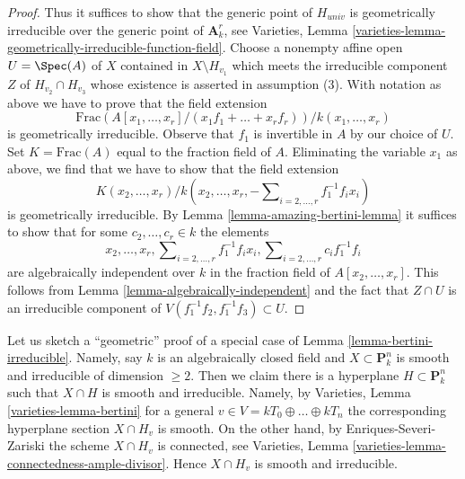 \begin{proof}
\medskip\noindent
Thus it suffices to show that the generic point of $H_{univ}$
is geometrically irreducible over the generic point of $\mathbf{A}^r_k$, see
Varieties, Lemma
\ref{varieties-lemma-geometrically-irreducible-function-field}.
Choose a nonempty affine open $U = \Spec(A)$ of $X$
contained in $X \setminus H_{v_1}$ which meets the irreducible
component $Z$ of $H_{v_2} \cap H_{v_3}$ whose existence is asserted in
assumption (3). With notation as above we have to prove that
the field extension
$$
\text{Frac}(A[x_1, \ldots, x_r]/(x_1f_1 + \ldots + x_rf_r))/
k(x_1, \ldots , x_r)
$$
is geometrically irreducible. Observe that $f_1$ is invertible in $A$
by our choice of $U$.
Set $K = \text{Frac}(A)$ equal to the fraction field of $A$.
Eliminating the variable $x_1$ as above,
we find that we have to show that the field extension
$$
K(x_2, \ldots, x_r)/
k(x_2, \ldots, x_r, -\sum\nolimits_{i = 2, \ldots, r} f_1^{-1}f_i x_i)
$$
is geometrically irreducible. By Lemma \ref{lemma-amazing-bertini-lemma}
it suffices to show that for some $c_2, \ldots, c_r \in k$ the elements
$$
x_2, \ldots, x_r, \sum\nolimits_{i = 2, \ldots, r} f_1^{-1}f_i x_i,
\sum\nolimits_{i = 2, \ldots, r} c_if_1^{-1}f_i
$$
are algebraically independent over $k$ in the fraction field of
$A[x_2, \ldots, x_r]$. This follows from
Lemma \ref{lemma-algebraically-independent}
and the fact that $Z \cap U$ is an irreducible
component of $V(f_1^{-1}f_2, f_1^{-1}f_3) \subset U$.
\end{proof}

\begin{remark}
\label{remark-geometric-proof-bertini-irreducible}
Let us sketch a ``geometric'' proof of a special case of
Lemma \ref{lemma-bertini-irreducible}. Namely, say $k$
is an algebraically closed field and $X \subset \mathbf{P}^n_k$ is smooth and
irreducible of dimension $\geq 2$. Then we claim there is a
hyperplane $H \subset \mathbf{P}^n_k$ such that $X \cap H$ is
smooth and irreducible. Namely, by
Varieties, Lemma \ref{varieties-lemma-bertini}
for a general $v \in V = kT_0 \oplus \ldots \oplus kT_n$
the corresponding hyperplane section $X \cap H_v$ is smooth.
On the other hand, by Enriques-Severi-Zariski the scheme
$X \cap H_v$ is connected, see
Varieties, Lemma \ref{varieties-lemma-connectedness-ample-divisor}.
Hence $X \cap H_v$ is smooth and irreducible.
\end{remark}













